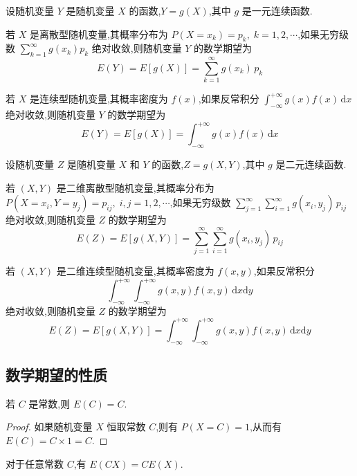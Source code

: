 \begin{theorem}
    \indent 设随机变量 $Y$ 是随机变量 $X$ 的函数,$Y=g(X)$,其中 $g$ 是一元连续函数.

    若 $X$ 是离散型随机变量,其概率分布为 $P(X=x_k) = p_k, \; k=1,2,\cdots$,如果无穷级数 $\displaystyle\sum_{k=1}^{\infty} g(x_k) p_k$ 绝对收敛,则随机变量 $Y$ 的数学期望为
    $$
    E(Y) = E[g(X)] = \sum_{k=1}^{\infty} g(x_k) \, p_k
    $$

    若 $X$ 是连续型随机变量,其概率密度为 $f(x)$,如果反常积分 $\displaystyle\int_{-\infty}^{+\infty} g(x) f(x) \, \text{d}x$ 绝对收敛,则随机变量 $Y$ 的数学期望为
    $$
    E(Y) = E[g(X)] = \int_{-\infty}^{+\infty} g(x) f(x) \, \text{d}x
    $$
\end{theorem}

\begin{theorem}
    \indent 设随机变量 $Z$ 是随机变量 $X$ 和 $Y$ 的函数,$Z=g(X,Y)$,其中 $g$ 是二元连续函数.

    若 $(X,Y)$ 是二维离散型随机变量,其概率分布为 $P(X=x_i,Y=y_j) = p_{ij}, \; i,j=1,2,\cdots$,如果无穷级数 $\displaystyle\sum_{j=1}^{\infty} \displaystyle\sum_{i=1}^{\infty} g(x_i,y_j) \, p_{ij}$ 绝对收敛,则随机变量 $Z$ 的数学期望为
    $$
    E(Z) = E[g(X,Y)] = \sum_{j=1}^{\infty} \sum_{i=1}^{\infty} g(x_i,y_j) \, p_{ij}
    $$

    若 $(X,Y)$ 是二维连续型随机变量,其概率密度为 $f(x,y)$,如果反常积分
    $$
    \displaystyle\int_{-\infty}^{+\infty} \displaystyle\int_{-\infty}^{+\infty} g(x,y) f(x,y) \, \text{d}x \text{d}y
    $$
    绝对收敛,则随机变量 $Z$ 的数学期望为
    $$
    E(Z) = E[g(X,Y)] = \int_{-\infty}^{+\infty} \int_{-\infty}^{+\infty} g(x,y) f(x,y) \, \text{d}x \text{d}y
    $$
\end{theorem}

\subsection{数学期望的性质}

\begin{property}[][][property:E(C)=C]
    \indent 若 $C$ 是常数,则 $E(C)=C$.
\end{property}

\begin{proof}
    如果随机变量 $X$ 恒取常数 $C$,则有 $P(X=C)=1$,从而有 $E(C) = C \times 1 = C$.
\end{proof}

\begin{property}[][][property:E(CX)=CE(X)]
    \indent 对于任意常数 $C$,有 $E(CX)=CE(X)$.
\end{property}


